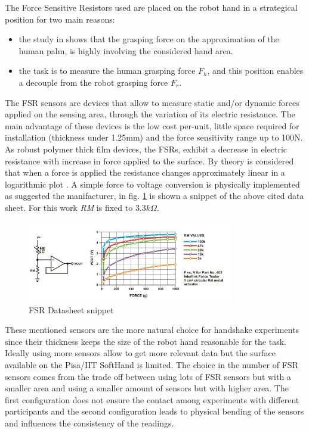 The Force Sensitive Resistors used are placed on the robot hand in a strategical position for two main reasons:
\begin{itemize}
\item the study in \cite{knoop2017handshakiness} shows that the grasping force on the approximation of the human palm, is highly involving the considered hand area.
\item the task is to measure the human grasping force $F_{h}$, and this position enables a decouple from the robot grasping force $F_{r}$.
\end{itemize}

The FSR sensors are devices that allow to measure static and/or dynamic forces applied on the sensing area, through the variation of its electric resistance. The main advantage of these devices is the low cost per-unit, little space required for installation (thickness under 1.25mm) and the force sensitivity range up to 100N.\\
As robust polymer thick film devices, the FSRs, exhibit a decrease in electric resistance with increase in force applied to the surface. By theory is considered that when a force is applied the resistance changes approximately linear in a logarithmic plot \cite{fsrdatasheet}.
A simple force to voltage conversion is physically implemented as suggested the manifacturer, in fig. \ref{Fig:FSRcircuit} is shown a snippet of the above cited data sheet. For this work \textit{RM} is fixed to $3.3 k \Omega $. \\
\begin{figure}[ht]
\centering
\includegraphics[width=0.8\textwidth]{Figure/fsr.png}
\caption{FSR Datasheet snippet}
\label{Fig:FSRcircuit}
\end{figure}
These mentioned sensors are the more natural choice for handshake experiments since their thickness keeps the size of the robot hand reasonable for the task.
% 
Ideally using more sensors allow to get more relevant data but the surface available on the Pisa/IIT SoftHand is limited. The choice in the number of FSR sensors comes from the trade off between using lots of FSR sensors but with a smaller area and using a smaller amount of sensors but with higher area. The first configuration does not ensure the contact among experiments with different participants and the second configuration leads to physical bending of the sensors and influences the consistency of the readings.

